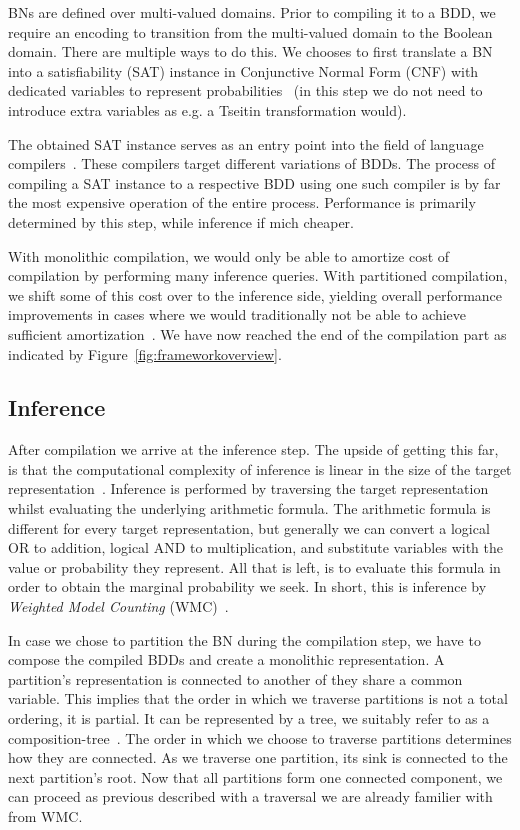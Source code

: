 BNs are defined over multi-valued domains. Prior to compiling it to a BDD, we require an encoding to transition from the multi-valued domain to the Boolean domain. There are multiple ways to do this. We chooses to first translate a BN into a satisfiability (SAT) instance in Conjunctive Normal Form (CNF) with dedicated variables to represent probabilities~\cite{chavira2008probabilistic,dal2017wpbdd} (in this step we do not need to introduce extra variables as e.g. a Tseitin transformation would).

The obtained SAT instance serves as an entry point into the field of language compilers~\cite{dudek2020addmc}. These compilers target different variations of BDDs. The process of compiling a SAT instance to a respective BDD using one such compiler is by far the most expensive operation of the entire process. Performance is primarily determined by this step, while inference if mich cheaper.

With monolithic compilation, we would only be able to amortize cost of compilation by performing many inference queries. With partitioned compilation, we shift some of this cost over to the inference side, yielding overall performance improvements in cases where we would traditionally not be able to achieve sufficient amortization~\cite{dal2017reducing}. We have now reached the end of the compilation part as indicated by Figure~\ref{fig:frameworkoverview}.

\subsection{Inference}

After compilation we arrive at the inference step. The upside of getting this far, is that the computational complexity of inference is linear in the size of the target representation~\cite{darwiche2002knowledge}. Inference is performed by traversing the target representation whilst evaluating the underlying arithmetic formula. The arithmetic formula is different for every target representation, but generally we can convert a logical OR to addition, logical AND to multiplication, and substitute variables with the value or probability they represent. All that is left, is to evaluate this formula in order to obtain the marginal probability we seek. In short, this is inference by \emph{Weighted Model Counting} (WMC)~\cite{chavira2008probabilistic}.

In case we chose to partition the BN during the compilation step, we have to compose the compiled BDDs and create a monolithic representation. A partition's representation is connected to another of they share a common variable. This implies that the order in which we traverse partitions is not a total ordering, it is partial. It can be represented by a tree, we suitably refer to as a composition-tree~\cite{dal2021compositional}. The order in which we choose to traverse partitions determines how they are connected. As we traverse one partition, its sink is connected to the next partition's root. Now that all partitions form one connected component, we can proceed as previous described with a traversal we are already familier with from WMC.


